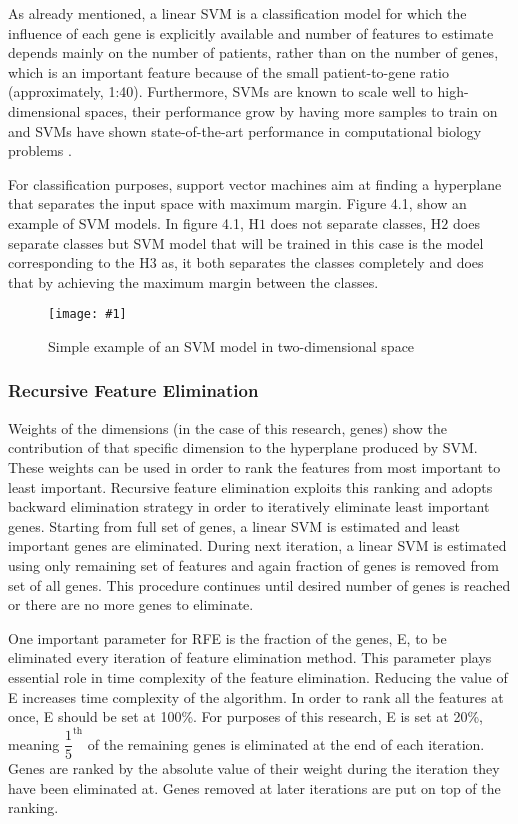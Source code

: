\documentclass{ba-kecs}
\numberwithin{figure}{section}
\numberwithin{equation}{section}
\newcommand{\dkepic}[2]{ %
	\begin{figure}[H] %
	\texttt{[image: \#1]}
	\caption{#2}
	\label{#1}
	\end{figure}
}
\begin{document}
As already mentioned, a linear SVM is a classification model for which the influence of each gene is explicitly available and number of features to estimate depends mainly on the number of patients, rather than on the number of genes, which is an important feature because of the small patient-to-gene ratio (approximately, 1:40). Furthermore, SVMs are known to scale well to high-dimensional spaces, their performance grow by having more samples to train on and SVMs have shown state-of-the-art performance in computational biology problems \cite{benhur}.

For classification purposes, support vector machines aim at finding a hyperplane that separates the input space with maximum margin. Figure 4.1, show an example of SVM models. In figure 4.1, $\mathrm{H1}$ does not separate classes, $\mathrm{H2}$ does separate classes but SVM model that will be trained in this case is the model corresponding to the $\mathrm{H3}$ as, it both separates the classes completely and does that by achieving the maximum margin between the classes.
\dkepic{SVM}{Simple example of an SVM model in two-dimensional space}

\subsubsection{Recursive Feature Elimination}

Weights of the dimensions (in the case of this research, genes) show the contribution of that specific dimension to the hyperplane produced by SVM. These weights can be used in order to rank the features from most important to least important. Recursive feature elimination exploits this ranking and adopts backward elimination strategy in order to iteratively eliminate least important genes. Starting from full set of genes, a linear SVM is estimated and least important genes are eliminated. During next iteration, a linear SVM is estimated using only remaining set of features and again fraction of genes is removed from set of all genes. This procedure continues until desired number of genes is reached or there are no more genes to eliminate. 

One important parameter for RFE is the fraction of the genes, E, to be eliminated every iteration of feature elimination method. This parameter plays essential role in time complexity of the feature elimination. Reducing the value of E increases time complexity of the algorithm. In order to rank all the features at once, E should be set at 100\%. For purposes of this research, E is set at 20\%, meaning $\dfrac{1}{5}^{\mathrm{th}}$ of the remaining genes is eliminated at the end of each iteration. Genes are ranked by the absolute value of their weight during the iteration they have been eliminated at. Genes removed at later iterations are put on top of the ranking.
\end{document}
